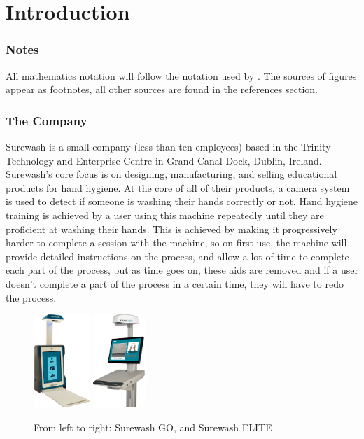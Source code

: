 \part{Introduction}
\section{Notes}
All mathematics notation will follow the notation used by \cite{Goodfellow-et-al-2016}. The sources of figures appear as footnotes, all other sources are found in the references section.
\section{The Company}
Surewash is a small company (less than ten employees) based in the Trinity Technology and Enterprise Centre in Grand Canal Dock, Dublin, Ireland. Surewash's core focus is on designing, manufacturing, and selling educational products for hand hygiene. At the core of all of their products, a camera system is used to detect if someone is washing their hands correctly or not. Hand hygiene training is achieved by a user using this machine repeatedly until they are proficient at washing their hands. This is achieved by making it progressively harder to complete a session with the machine, so on first use, the machine will provide detailed instructions on the process, and allow a lot of time to complete each part of the process, but as time goes on, these aids are removed and if a user doesn't complete a part of the process in a certain time, they will have to redo the process.

\begin{figure}[h]
    \centering
    \includegraphics[height=100pt]{../img/sw_go.png}
    \space \space \space \space \space \space \space \space \space \space \space \space
    \includegraphics[height=100pt]{../img/sw_elite.png}
    \caption[]{From left to right: Surewash GO, and Surewash ELITE\footnotemark}
    \label{fig:sw_elite_go}
\end{figure}

